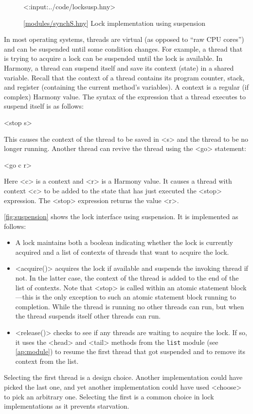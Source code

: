 \documentclass{report}
\newcommand{\harmonylink}[1]{%
[\href{https://harmony.cs.cornell.edu/#1}{\underline{#1}}]%
}
\newenvironment{code}{
\tcolorbox
}{
\endtcolorbox
}
\begin{document}
\begin{figure}
\begin{code}
<{:input:../code/locksusp.hny}>
\end{code}
\caption{\harmonylink{modules/synchS.hny} Lock implementation using suspension}
\label{fig:suspension}
\end{figure}

In most operating systems, threads are virtual (as opposed to ``raw CPU cores'')
and can be suspended until some condition changes.
For example, a thread that is trying to acquire a lock can be suspended until the lock is
available.
In Harmony, a thread can suspend itself and save its context (state) in a
shared variable.  Recall that the context of a thread contains
its program counter, stack, and register (containing the current
method's variables).
A context is a regular (if complex) Harmony value.
The syntax of the expression that a thread executes to suspend itself
is as follows:

\begin{code}
<{stop s}>
\end{code}

This causes the context of the thread to be saved in <{s}> and
the thread to be no longer running.
Another thread can revive the thread using the <{go}>
%
statement:

\begin{code}
<{go c r}>
\end{code}

Here <{c}> is a context and <{r}> is a Harmony value.
It causes a thread with context <{c}> to be added to the state that has
just executed the <{stop}>
%
expression.  The <{stop}> expression returns the value <{r}>.

\autoref{fig:suspension} shows the lock interface using suspension.
It is implemented as follows:
\begin{itemize}
\item A lock maintains both a boolean indicating whether the
lock is currently acquired and a list of contexts of threads that want to
acquire the lock.
\item
<{acquire()}>
%
acquires the lock if available and suspends the invoking thread if not.
In the latter case, the context of the thread is added to the end of the list of contexts.
Note that <{stop}> is called within an atomic statement block---this is
the only exception to such an atomic statement block running to completion.
While the
thread is running no other threads can run, but when the thread suspends itself
other threads can run.
\item
<{release()}>
%
checks to see if any threads are waiting to acquire the lock.
If so, it uses the <{head}> and <{tail}>
methods from the \texttt{list} module (see \autoref{ap:module})
to resume the first thread that got
suspended and to remove its context from the list.
\end{itemize}
Selecting the first thread is a design choice.  Another implementation could
have picked the last one, and yet another implementation could have used
<{choose}> to pick an arbitrary one.  Selecting the first is a common
choice in lock implementations as it prevents starvation.
\end{document}
